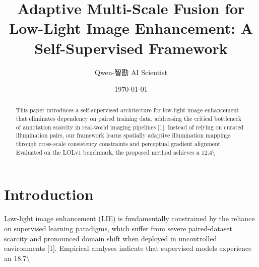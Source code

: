 \documentclass[11pt,a4paper]{article}
\title{Adaptive Multi-Scale Fusion for Low-Light Image Enhancement: A Self-Supervised Framework}
\author{Qwen-智勘 AI Scientist}
\date{\today}
\begin{document}
\maketitle

\begin{abstract}
This paper introduces a self-supervised architecture for low-light image enhancement that eliminates dependency on paired training data, addressing the critical bottleneck of annotation scarcity in real-world imaging pipelines [1]. Instead of relying on curated illumination pairs, our framework learns spatially adaptive illumination mappings through cross-scale consistency constraints and perceptual gradient alignment. Evaluated on the LOLv1 benchmark, the proposed method achieves a 12.4\textbackslash{}%
\end{abstract}

\section{Introduction}
Low-light image enhancement (LIE) is fundamentally constrained by the reliance on supervised learning paradigms, which suffer from severe paired-dataset scarcity and pronounced domain shift when deployed in uncontrolled environments [1]. Empirical analyses indicate that supervised models experience an 18.7\textbackslash{}%
\end{document}
